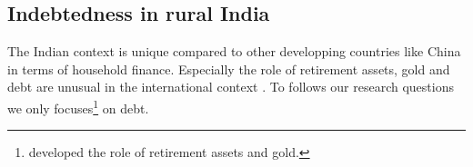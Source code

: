 \documentclass[a4paper, 11pt, onecolumn]{article}
\begin{document}
	\subsection{Indebtedness in rural India}
	\label{ss:finance}
The Indian context is unique compared to other developping countries like China in terms of household finance.
Especially the role of retirement assets, gold and debt are unusual in the international context \citep{Badarinza2016b}.
To follows our research questions we only focuses\footnote{\cite{Badarinza2016b} developed the role of retirement assets and gold.} on debt.
\end{document}
